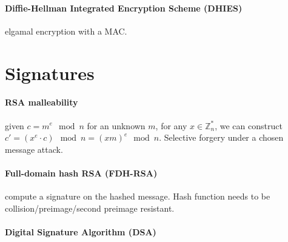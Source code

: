 \documentclass[11pt]{article}
\begin{document}
\paragraph{Diffie-Hellman Integrated Encryption Scheme (DHIES)} elgamal encryption with a MAC.

\section{Signatures}

\paragraph{RSA malleability} given $c = m^e \mod n$ for an unknown $m$, for any $x \in \mathbb{Z}_n^*$, we can construct $c' = (x^e \cdot c) \mod n = (xm)^e \mod n$. Selective forgery under a chosen message attack.

\paragraph{Full-domain hash RSA (FDH-RSA)} compute a signature on the hashed message. Hash function needs to be collision/preimage/second preimage resistant.

\paragraph{Digital Signature Algorithm (DSA)}
\end{document}
